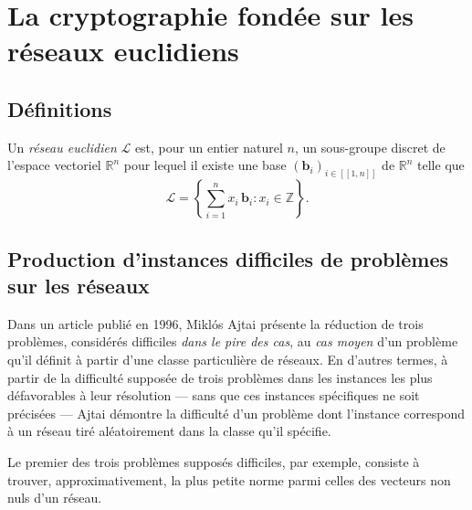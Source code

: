 
\section{La cryptographie fondée sur les réseaux euclidiens} %
\label{sec:reseaux}




\subsection{Définitions}
Un \emph{réseau euclidien} $\mathcal{L}$ est, pour un entier naturel $n$, un sous-groupe discret de l’espace vectoriel $\mathbb{R}^n$ pour lequel il existe une base $(\mathbf{b}_i)_{i\in[\![1, n]\!]}$ de $\mathbb{R}^n$ telle que
\[
\mathcal{L} =\left\{ \sum^n_{i=1} x_i\,\mathbf{b}_i : x_i \in \mathbb Z\right\}\text{.}
\]


\subsection{Production d'instances difficiles de problèmes sur les réseaux}

Dans un article\cite{STOC:Ajtai96} publié en 1996, Miklós Ajtai présente la réduction de trois problèmes, considérés
difficiles \emph{dans le pire des cas}, au \emph{cas moyen} d’un problème qu’il définit à partir
d’une classe particulière de réseaux.
En d’autres termes, à partir de la difficulté supposée de trois problèmes dans les instances les
plus défavorables à leur résolution --- sans que ces instances spécifiques ne soit précisées ---
Ajtai démontre la difficulté d’un problème dont l’instance correspond à un réseau tiré aléatoirement
dans la classe qu’il spécifie.

Le premier des trois problèmes supposés difficiles, par exemple, consiste à trouver,
approximativement, la plus petite norme parmi celles des vecteurs non nuls d’un réseau.


